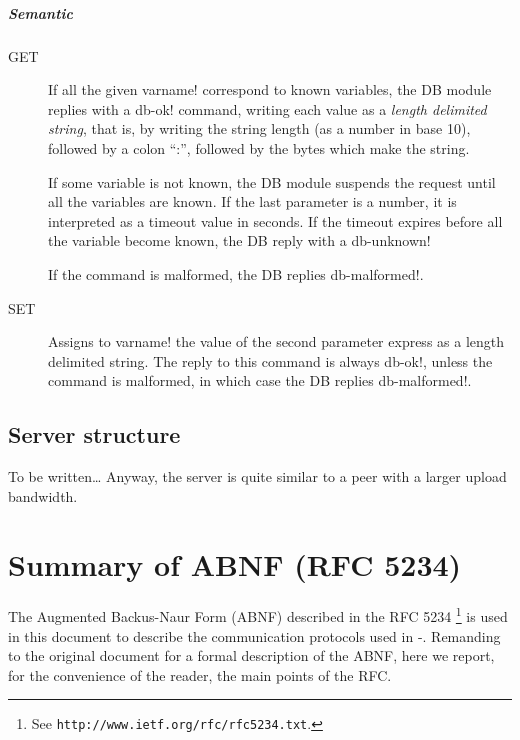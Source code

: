 \documentclass{medusabook}
\begin{document}
\paragraph{Semantic}

\begin{description}
  \item[GET] If all the given \ttt varname! correspond to known
  variables, the DB module replies with a \ttt db-ok! command, writing
  each value as a \emph{length delimited string}, that is, by writing
  the string length (as a number in base 10), followed by a colon
  ``:'', followed by the bytes which make the string.

  If some variable is not known, the DB module suspends the request
  until all the variables are known.  If the last parameter is a
  number, it is interpreted as a timeout value in seconds.  If the
  timeout expires before all the variable become known, the DB reply
  with a \ttt db-unknown!

  If the command is malformed, the DB replies \ttt db-malformed!.
  \item[SET] Assigns to \ttt varname! the value of the second
  parameter express as a length delimited string.  The reply to this
  command is always \ttt db-ok!, unless the command is malformed, in
  which case the DB replies \ttt db-malformed!.
\end{description}


\section{Server structure}
\label{sect:2.0;medusa_book}

To be written\ldots{} Anyway, the server is quite similar to a peer
with a larger upload bandwidth.

\appendix

\chapter{Summary of ABNF (RFC 5234)}
\label{chap:3;medusa_book}

The Augmented Backus-Naur Form (ABNF) described in the RFC
5234 \cite{rfc5234}\footnote{See \texttt{http://www.ietf.org/rfc/rfc5234.txt}.} is
used in this document to describe the communication protocols used in
\medusa-.  Remanding to the original document for a formal description of the
ABNF, here we report, for the convenience of the reader, the main
points of the RFC.
\end{document}
